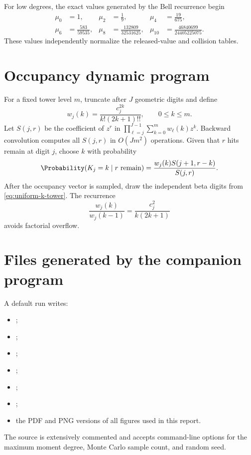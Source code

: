 \documentclass[11pt,oneside]{article}
\theoremstyle{definition}
\theoremstyle{remark}
\begin{document}
For low degrees, the exact values generated by the Bell recurrence begin
\begin{align*}
 \mu_0&=1,&
 \mu_2&=\frac19,&
 \mu_4&=\frac{19}{675},\\
 \mu_6&=\frac{583}{59535},&
 \mu_8&=\frac{132809}{32531625},&
 \mu_{10}&=\frac{46840699}{24405225075}.
\end{align*}
These values independently normalize the released-value and collision tables.

\section{Occupancy dynamic program}
\label{app:occupancy-DP}

For a fixed tower level $m$, truncate after $J$ geometric digits and define
\begin{equation}
 w_j(k)=\frac{c_j^{2k}}{k!(2k+1)!!},
 \qquad 0\le k\le m.                                \label{eq:wjk}
\end{equation}
Let $S(j,r)$ be the coefficient of $z^r$ in
$\prod_{\ell=j}^{J-1}\sum_{k=0}^mw_\ell(k)z^k$.  Backward convolution computes
all $S(j,r)$ in $O(Jm^2)$ operations.  Given that $r$ hits remain at digit $j$,
choose $k$ with probability
\begin{equation}
 \Probability(K_j=k\mid r\text{ remain})
 =\frac{w_j(k)S(j+1,r-k)}{S(j,r)}.                  \label{eq:DP-transition}
\end{equation}
After the occupancy vector is sampled, draw the independent beta digits from
\eqref{eq:uniform-k-tower}.  The recurrence
\begin{equation}
 \frac{w_j(k)}{w_j(k-1)}
 =\frac{c_j^2}{k(2k+1)}                             \label{eq:wj-recurrence}
\end{equation}
avoids factorial overflow.

\section{Files generated by the companion program}

A default run writes:
\begin{itemize}
\item {};
\item {};
\item {};
\item {};
\item {};
\item {};
\item the PDF and PNG versions of all figures used in this report.
\end{itemize}
The source is extensively commented and accepts command-line options for the
maximum moment degree, Monte Carlo sample count, and random seed.
\end{document}
